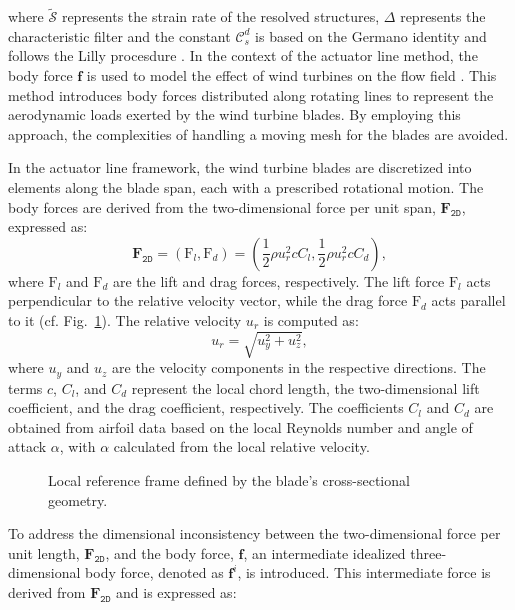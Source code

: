 \documentclass[11pt,a4paper]{article}
\begin{document}
where $\widetilde{\boldsymbol{\mathcal{S}}}$ represents the strain rate of the resolved structures, $\Delta$ represents the characteristic filter and the constant $\mathcal{C}^d_s$ is based on the Germano identity \citep{germano1991dynamic} and follows the Lilly procesdure \citep{lilly4proposed}.
%
%
In the context of the actuator line method, the body force $\boldsymbol{f}$ is used to model the effect of wind turbines on the flow field \citep{sorensen2002numerical, mikkelsen2003actuator, troldborg2009actuator}. This method introduces body forces distributed along rotating lines to represent the aerodynamic loads exerted by the wind turbine blades. By employing this approach, the complexities of handling a moving mesh for the blades are avoided. 
%

In the actuator line framework, the wind turbine blades are discretized into elements along the blade span, each with a prescribed rotational motion. The body forces are derived from the two-dimensional force per unit span, $\boldsymbol{\text{F}}_{\texttt{2D}}$, expressed as:
%
\begin{equation}
\boldsymbol{\text{F}}_{\texttt{2D}} = (\text{F}_l, \text{F}_d) = 
\left( 
\frac{1}{2} \rho u_r^2 c C_l, 
\frac{1}{2} \rho u_r^2 c C_d 
\right),
\label{eq:2d_forces}
\end{equation}
%
where $\text{F}_l$ and $\text{F}_d$ are the lift and drag forces, respectively. The lift force $\text{F}_l$ acts perpendicular to the relative velocity vector, while the drag force $\text{F}_d$ acts parallel to it (cf. Fig.~\ref{fig:2dref}). 
%
The relative velocity $u_r$ is computed as:
\begin{equation}
u_r = \sqrt{u_y^2 + u_z^2},
\end{equation}
%
where $u_y$ and $u_z$ are the velocity components in the respective directions. The terms $c$, $C_l$, and $C_d$ represent the local chord length, the two-dimensional lift coefficient, and the drag coefficient, respectively. The coefficients $C_l$ and $C_d$ are obtained from airfoil data based on the local Reynolds number and angle of attack $\alpha$, with $\alpha$ calculated from the local relative velocity.
%
\begin{figure}
\centering

\caption{Local reference frame defined by the blade's cross-sectional geometry.}
\label{fig:2dref}
\end{figure}
%
To address the dimensional inconsistency between the two-dimensional force per unit length, $\boldsymbol{\text{F}}_{\texttt{2D}}$, and the body force, $\boldsymbol{f}$, an intermediate idealized three-dimensional body force, denoted as $\boldsymbol{f}^i$, is introduced. This intermediate force is derived from $\boldsymbol{\text{F}}_{\texttt{2D}}$ and is expressed as:
\end{document}
